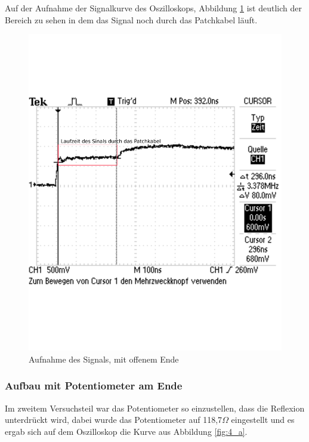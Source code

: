 \documentclass[12pt,a4paper]{article}
\begin{document}
Auf der Aufnahme der Signalkurve des Oszilloskops, Abbildung \ref{fig:4_o} ist deutlich der Bereich zu sehen in dem das Signal noch durch das Patchkabel läuft.

\begin{figure}[H] 
  \centering
    \includegraphics[scale = 0.5]{4_o.pdf}
  	\caption[Aufnahme des Signals, mit offenem Ende]{Aufnahme des Signals, mit offenem Ende}
  \label{fig:4_o}
\end{figure}

\subsubsection{Aufbau mit Potentiometer am Ende}

Im zweitem Versuchsteil war das Potentiometer so einzustellen, dass die Reflexion unterdrückt wird, dabei wurde das Potentiometer auf 118,7$\Omega$ eingestellt und es ergab sich auf dem Oszilloskop die Kurve aus Abbildung \ref{fig:4_a}.
\end{document}
